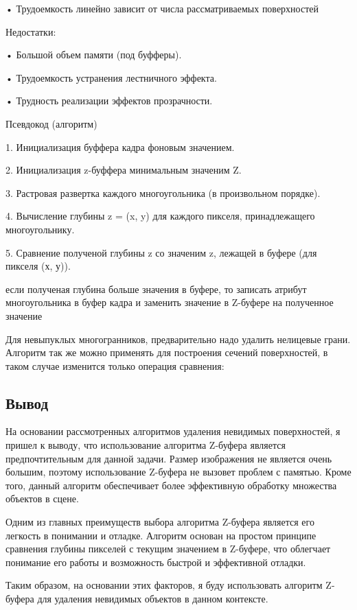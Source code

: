     • Трудоемкость линейно зависит от числа рассматриваемых поверхностей
    
Недостатки:

    • Большой объем памяти (под буфферы).
    
    • Трудоемкость устранения лестничного эффекта.
    
    • Трудность реализации эффектов прозрачности.
    
Псевдокод (алгоритм)

1. Инициализация буффера кадра фоновым значением.

2. Инициализация z-буффера минимальным значеним Z.

3. Растровая развертка каждого многоугольника (в произвольном порядке).

4. Вычисление глубины z = (x, y) для каждого пикселя, принадлежащего многоугольнику.

5. Сравнение полученой глубины z со значеним z, лежащей в буфере (для пикселя (х, у)).

   если полученая глубина больше значения в буфере, то записать атрибут многоугольника
   в буфер кадра и заменить значение в Z-буфере на полученное значение

Для невыпуклых многогранников, предварительно надо удалить нелицевые грани.
Алгоритм так же можно применять для построения сечений поверхностей, в таком случае изменится только операция сравнения:
 
\subsection{Вывод}

 На основании рассмотренных алгоритмов удаления невидимых поверхностей, я пришел к выводу, что использование алгоритма Z-буфера является предпочтительным для данной задачи. Размер изображения не является очень большим, поэтому использование Z-буфера не вызовет проблем с памятью. Кроме того, данный алгоритм обеспечивает более эффективную обработку множества объектов в сцене.

Одним из главных преимуществ выбора алгоритма Z-буфера является его легкость в понимании и отладке. Алгоритм основан на простом принципе сравнения глубины пикселей с текущим значением в Z-буфере, что облегчает понимание его работы и возможность быстрой и эффективной отладки.

Таким образом, на основании этих факторов, я буду использовать алгоритм Z-буфера для удаления невидимых объектов в данном контексте.


